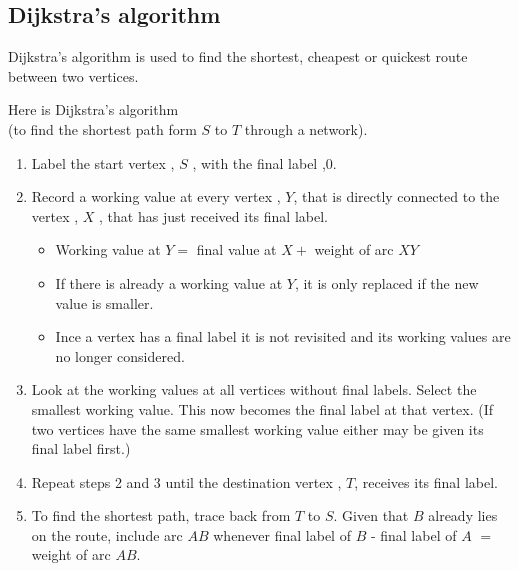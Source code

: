 \documentclass[a4paper]{article}
\begin{document}
\subsection{Dijkstra's algorithm}
Dijkstra's algorithm is used to find the shortest, cheapest or quickest route between two vertices.

\begin{defi}
	Here is Dijkstra's algorithm\\
	(to find the shortest path form $S$ to $T$ through a network).
	\begin{enumerate}
		\item Label the start vertex , $S$ , with the final label ,$0$.
		\item Record a working value at every vertex , $Y$, that is directly connected to the vertex , $X$ , that has just received its final label.
		      \begin{itemize}
			      \item Working value at $Y=$ final value at $X+$ weight of arc $XY$
			      \item If there is already a working value at $Y$, it is only replaced if the new value is smaller.
			      \item Ince a vertex has a final label it is not revisited and its working values are no longer considered.
		      \end{itemize}
		\item Look at the working values at all vertices without final labels. Select the smallest working value. This now becomes the final label at that vertex. (If two vertices have the same smallest working  value either may be given its final label first.)
		\item Repeat steps 2 and 3 until the destination vertex , $T$, receives its final label.
		\item To find the shortest path, trace back from $T$ to $S$. Given that $B$ already lies on the route, include arc $AB$ whenever final label of $B$ - final label of $A$ $=$ weight of arc $AB$.
	\end{enumerate}
\end{defi}
\begin{eg}

\end{eg}
\begin{eg}

\end{eg}
\begin{eg}

\end{eg}
\end{document}

